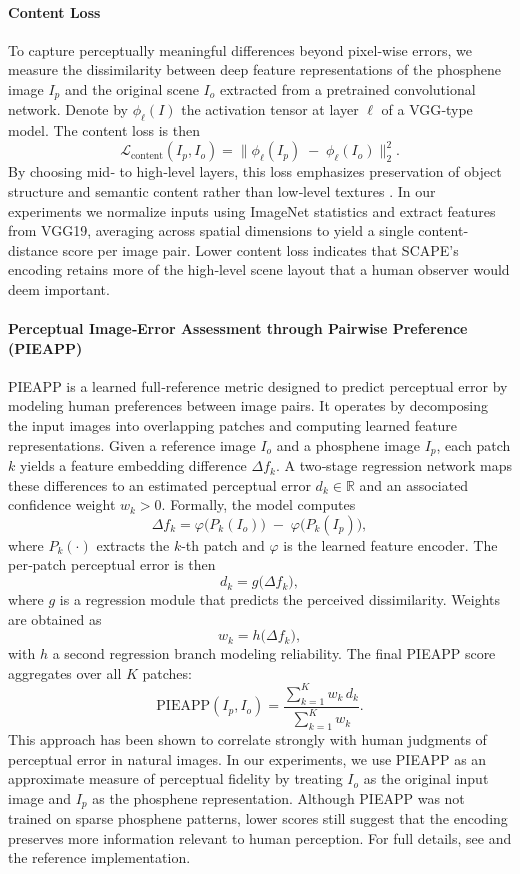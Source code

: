 \paragraph{Content Loss}  
To capture perceptually meaningful differences beyond pixel‐wise errors, we measure the dissimilarity between deep feature representations of the phosphene image \(I_p\) and the original scene \(I_o\) extracted from a pretrained convolutional network.  Denote by \(\phi_\ell(I)\) the activation tensor at layer \(\ell\) of a VGG‐type model.  The content loss is then  
\[
\mathcal{L}_{\mathrm{content}}(I_p,I_o)
= \bigl\lVert \phi_\ell(I_p) \;-\;\phi_\ell(I_o)\bigr\rVert_2^2.
\]
By choosing mid‐ to high‐level layers, this loss emphasizes preservation of object structure and semantic content rather than low‐level textures \cite{Gatys2015,Zhang2018}.  In our experiments we normalize inputs using ImageNet statistics and extract features from VGG19, averaging across spatial dimensions to yield a single content‐distance score per image pair.  Lower content loss indicates that SCAPE’s encoding retains more of the high‐level scene layout that a human observer would deem important.  



\paragraph{Perceptual Image‐Error Assessment through Pairwise Preference (PIEAPP)}  
PIEAPP \cite{Prashnani2018} is a learned full‐reference metric designed to predict perceptual error by modeling human preferences between image pairs. It operates by decomposing the input images into overlapping patches and computing learned feature representations. Given a reference image \(I_o\) and a phosphene image \(I_p\), each patch \(k\) yields a feature embedding difference \(\Delta f_k\). A two‐stage regression network maps these differences to an estimated perceptual error \(d_k\in\mathbb{R}\) and an associated confidence weight \(w_k>0\). Formally, the model computes
\[
\Delta f_k = \varphi\bigl(P_k(I_o)\bigr)\;-\;\varphi\bigl(P_k(I_p)\bigr),
\]
where \(P_k(\cdot)\) extracts the \(k\)-th patch and \(\varphi\) is the learned feature encoder. The per‐patch perceptual error is then
\[
d_k = g\bigl(\Delta f_k\bigr),
\]
where \(g\) is a regression module that predicts the perceived dissimilarity. Weights are obtained as
\[
w_k = h\bigl(\Delta f_k\bigr),
\]
with \(h\) a second regression branch modeling reliability. The final PIEAPP score aggregates over all \(K\) patches:
\[
\mathrm{PIEAPP}(I_p, I_o)
= \frac{\sum_{k=1}^K w_k \, d_k}{\sum_{k=1}^K w_k}.
\]
This approach has been shown to correlate strongly with human judgments of perceptual error in natural images. In our experiments, we use PIEAPP as an approximate measure of perceptual fidelity by treating \(I_o\) as the original input image and \(I_p\) as the phosphene representation. Although PIEAPP was not trained on sparse phosphene patterns, lower scores still suggest that the encoding preserves more information relevant to human perception. For full details, see \cite{Prashnani2018} and the reference implementation.  


